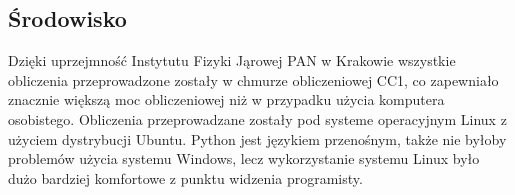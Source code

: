\subsection{Środowisko}
Dzięki uprzejmność Instytutu Fizyki Jąrowej PAN w Krakowie wszystkie obliczenia przeprowadzone zostały w chmurze obliczeniowej CC1, co zapewniało znacznie większą moc obliczeniowej niż w przypadku użycia komputera osobistego. Obliczenia przeprowadzane zostały pod systeme operacyjnym Linux z użyciem dystrybucji Ubuntu. Python jest językiem przenośnym, także nie byłoby problemów użycia systemu Windows, lecz wykorzystanie systemu Linux było dużo bardziej komfortowe z punktu widzenia programisty.

